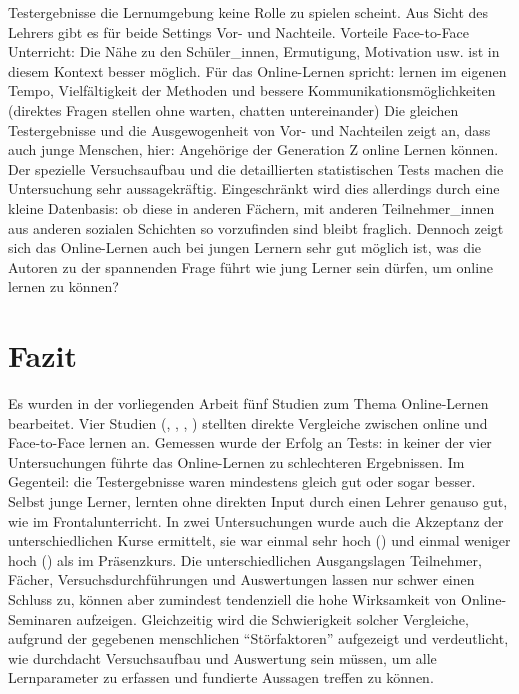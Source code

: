 \documentclass[12pt, bibliography=totoc]{scrartcl}
\begin{document}
Testergebnisse die Lernumgebung keine Rolle zu spielen scheint. Aus
Sicht des Lehrers gibt es für beide Settings Vor- und Nachteile.
Vorteile Face-to-Face Unterricht: Die Nähe zu den Schüler\_innen,
Ermutigung, Motivation usw. ist in diesem Kontext besser möglich. Für
das Online-Lernen spricht: lernen im eigenen Tempo, Vielfältigkeit der
Methoden und bessere Kommunikationsmöglichkeiten (direktes Fragen
stellen ohne warten, chatten untereinander) Die gleichen Testergebnisse
und die Ausgewogenheit von Vor- und Nachteilen zeigt an, dass auch junge
Menschen, hier: Angehörige der Generation Z online Lernen können. Der
spezielle Versuchsaufbau und die detaillierten statistischen Tests
machen die Untersuchung sehr aussagekräftig. Eingeschränkt wird dies
allerdings durch eine kleine Datenbasis: ob diese in anderen Fächern,
mit anderen Teilnehmer\_innen aus anderen sozialen Schichten so
vorzufinden sind bleibt fraglich. Dennoch zeigt sich das Online-Lernen
auch bei jungen Lernern sehr gut möglich ist, was die Autoren zu der
spannenden Frage führt wie jung Lerner sein dürfen, um online lernen zu
können?

\section{Fazit}\label{fazit}

Es wurden in der vorliegenden Arbeit fünf Studien zum Thema
Online-Lernen bearbeitet. Vier Studien
(\parencite{hohenberg2009erfolgreiches}, \parencite{Fischer2014a},
\parencite{mentzer2007two}, \parencite{Edwards2013}) stellten direkte
Vergleiche zwischen online und Face-to-Face lernen an. Gemessen wurde
der Erfolg an Tests: in keiner der vier Untersuchungen führte das
Online-Lernen zu schlechteren Ergebnissen. Im Gegenteil: die
Testergebnisse waren mindestens gleich gut oder sogar besser. Selbst
junge Lerner, lernten ohne direkten Input durch einen Lehrer genauso
gut, wie im Frontalunterricht. In zwei Untersuchungen wurde auch die
Akzeptanz der unterschiedlichen Kurse ermittelt, sie war einmal sehr
hoch (\parencite{Nistor2005a}) und einmal weniger hoch
(\parencite{mentzer2007two}) als im Präsenzkurs. Die unterschiedlichen
Ausgangslagen Teilnehmer, Fächer, Versuchsdurchführungen und
Auswertungen lassen nur schwer einen Schluss zu, können aber zumindest
tendenziell die hohe Wirksamkeit von Online-Seminaren aufzeigen.
Gleichzeitig wird die Schwierigkeit solcher Vergleiche, aufgrund der
gegebenen menschlichen ``Störfaktoren'' aufgezeigt und verdeutlicht, wie
durchdacht Versuchsaufbau und Auswertung sein müssen, um alle
Lernparameter zu erfassen und fundierte Aussagen treffen zu können.
\pagebreak
\printbibliography
\pagebreak
%
%
\end{document}
